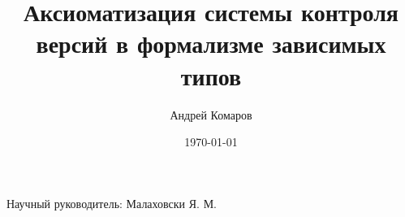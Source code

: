 \documentclass[14pt]{beamer}
\title{Аксиоматизация системы контроля версий в формализме зависимых типов}
\author{Андрей Комаров}
\institute{НИУ ИТМО}
\date{\today}
\begin{document}
{
\begin{frame}
  \maketitle

  \begin{flushright}
    Научный руководитель: Малаховски Я. М.
  \end{flushright}
\end{frame}
}






%






\end{document}
